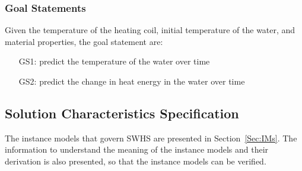 \documentclass[12pt]{article}
\begin{document}
\subsubsection{Goal Statements}
\label{Sec:GoalStmt}
Given the temperature of the heating coil, initial temperature of the water, and material properties, the goal statement are:
\begin{itemize}
\item[GS1:]predict the temperature of the water over time
\item[GS2:]predict the change in heat energy in the water over time
\end{itemize}
\subsection{Solution Characteristics Specification}
\label{Sec:SolCharSpec}
The instance models that govern SWHS are presented in Section~\ref{Sec:IMs}. The information to understand the meaning of the instance models and their derivation is also presented, so that the instance models can be verified.
\end{document}
